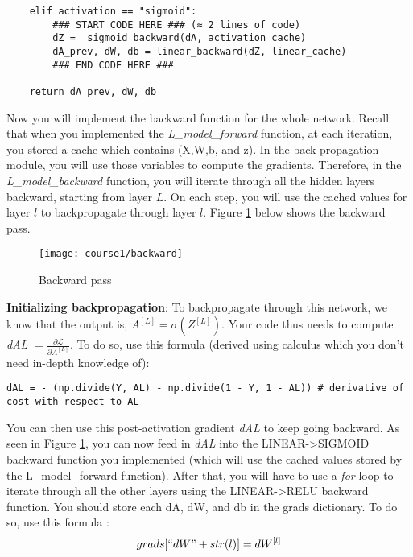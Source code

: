 {\begin{verbatim}
    elif activation == "sigmoid":
        ### START CODE HERE ### (≈ 2 lines of code)
        dZ =  sigmoid_backward(dA, activation_cache)
        dA_prev, dW, db = linear_backward(dZ, linear_cache)
        ### END CODE HERE ###
    
    return dA_prev, dW, db
\end{verbatim}



Now you will implement the backward function for the whole network. Recall that when you implemented the \emph{L\_model\_forward} function, at each iteration, you stored a cache which contains (X,W,b, and z). In the back propagation module, you will use those variables to compute the gradients. Therefore, in the \emph{L\_model\_backward} function, you will iterate through all the hidden layers backward, starting from layer $L$. On each step, you will use the cached values for layer $l$ to backpropagate through layer $l$. Figure \ref{fig: backward} below shows the backward pass. 

\begin{figure}[h]
\begin{center}
\texttt{[image: course1/backward]}
\end{center}
\caption{Backward pass}
\label{fig: backward}
\end{figure}


{\textbf {Initializing backpropagation}}:
To backpropagate through this network, we know that the output is, 
$A^{[L]} = \sigma(Z^{[L]})$. Your code thus needs to compute \emph{dAL} $= \frac{\partial \mathcal{L}}{\partial A^{[L]}}$.
To do so, use this formula (derived using calculus which you don't need in-depth knowledge of):
\begin{verbatim}
dAL = - (np.divide(Y, AL) - np.divide(1 - Y, 1 - AL)) # derivative of cost with respect to AL
\end{verbatim}

You can then use this post-activation gradient \emph{dAL} to keep going backward. As seen in Figure \ref{fig: backward}, you can now feed in \emph{dAL} into the LINEAR->SIGMOID backward function you implemented (which will use the cached values stored by the L\_model\_forward function). After that, you will have to use a \emph{for} loop to iterate through all the other layers using the LINEAR->RELU backward function. You should store each dA, dW, and db in the grads dictionary. To do so, use this formula : 
\begin{equation}
grads[``dW" + str(l)] = dW^{[l]}
\end{equation}

}
